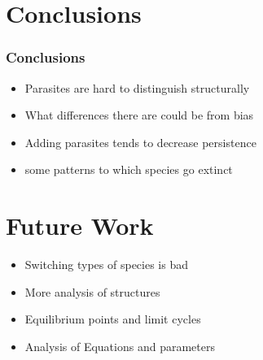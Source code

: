 \documentclass{beamer}
\begin{document}
%
%

\section{Conclusions}
\begin{frame}
\frametitle{Conclusions}
\begin{itemize}[<+->]
\item Parasites are hard to distinguish structurally
\item What differences there are could be from bias
\item Adding parasites tends to decrease persistence
\item some patterns to which species go extinct
\end{itemize}
\end{frame}


\section{Future Work}
\begin{frame}
\begin{itemize}[<+->]
\item Switching types of species is bad
\item More analysis of structures
\item Equilibrium points and limit cycles
\item Analysis of Equations and parameters
\end{itemize}
\end{frame}
\end{document}
